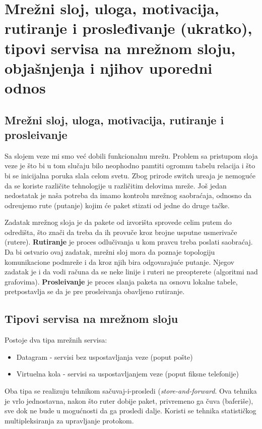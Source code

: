 \documentclass{article} %
\begin{document}
\section{Mrežni sloj, uloga, motivacija, rutiranje i prosleđivanje (ukratko), tipovi servisa na mrežnom sloju, objašnjenja i njihov uporedni odnos}

\subsection{Mre\v{z}ni sloj, uloga, motivacija, rutiranje i prosle\dj{}ivanje}

Sa slojem veze mi smo ve\'{c} dobili funkcionalnu mre\v{z}u. Problem sa pristupom sloja veze je \v{s}to bi u tom slu\v{c}aju bilo neophodno pamtiti ogromnu tabelu relacija i \v{s}to bi se inicijalna poruka slala celom svetu. Zbog prirode switch ure\dj{}aja je nemogu\'{c}e da se koriste razli\v{c}ite tehnologije u razli\v{c}itim delovima mre\v{z}e. Jo\v{s} jedan nedostatak je na\v{s}a potreba da imamo kontrolu mre\v{z}nog saobra\'{c}aja, odnosno da odre\dj{}ujemo rute (putanje) kojim \'{c}e paket stizati od jedne do druge ta\v{c}ke.

Zadatak mre\v{z}nog sloja je da pakete od izvori\v{s}ta sprovede celim putem do odredi\v{s}ta, \v{s}to zna\v{c}i da treba da ih provu\v{c}e kroz brojne usputne usmeriva\v{c}e (rutere). \textbf{Rutiranje} je proces odlu\v{c}ivanja u kom pravcu treba poslati saobra\'{c}aj. Da bi ostvario ovaj zadatak, mre\v{z}ni sloj mora da poznaje topologiju komunikacione podmre\v{z}e i da kroz njih bira odgovaraju\'{c}e putanje. Njegov zadatak je i da vodi ra\v{c}una da se neke linije i ruteri ne preopterete (algoritmi nad grafovima). \textbf{Prosle\dj{}ivanje} je proces slanja paketa na osnovu lokalne tabele, pretpostavlja se da je pre prosle\dj{}ivanja obavljeno rutiranje.

\subsection{Tipovi servisa na mre\v{z}nom sloju}

Postoje dva tipa mre\v{z}nih servisa:
\begin{itemize}
	\item Datagram - servisi bez uspostavljanja veze (poput po\v{s}te)
	\item Virtuelna kola - servisi sa uspostavljanjem veze (poput fiksne telefonije)
\end{itemize}

Oba tipa se realizuju tehnikom sa\v{c}uvaj-i-prosledi (\textit{store-and-forward}. Ova tehnika je vrlo jednostavna, nakon \v{s}to ruter dobije paket, privremeno ga \v{c}uva (baferi\v{s}e), sve dok ne bude u mogu\'{c}nosti da ga prosledi dalje. Koristi se tehnika statisti\v{c}kog multipleksiranja za upravljanje protokom.
\end{document}
